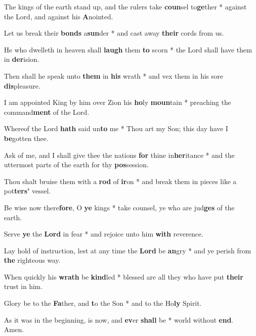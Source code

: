 \begin{multicols}{2}
	The kings of the earth stand up, and the rulers take \textbf{coun}sel to\textbf{ge}ther * against the Lord, and against his \textbf{A}nointed.
	
	Let us break their \textbf{bonds} a\textbf{sun}der * and cast away \textbf{their} cords from us.
	
	He who dwelleth in heaven shall \textbf{laugh} them \textbf{to} scorn * the Lord shall have them in \textbf{der}ision.
	
	Then shall he speak unto \textbf{them} in \textbf{his} wrath * and vex them in his sore \textbf{dis}pleasure.
	
	I am appointed King by him over Zion his \textbf{ho}ly \textbf{moun}tain * preaching the command\textbf{ment} of the Lord.
	
	Whereof the Lord \textbf{hath} said un\textbf{to} me * Thou art my Son; this day have I \textbf{be}gotten thee.
	
	Ask of me, and I shall give thee the nations \textbf{for} thine in\textbf{her}itance * and the uttermost parts of the earth for thy \textbf{pos}session.
	
	Thou shalt bruise them with a \textbf{rod} of \textbf{ir}on * and break them in pieces like a pot\textbf{ters'} vessel.
	
	Be wise now there\textbf{fore}, O \textbf{ye} kings * take counsel, ye who are jud\textbf{ges} of the earth.
	
	Serve \textbf{ye} the \textbf{Lord} in fear * and rejoice unto him \textbf{with} reverence.
	
	Lay hold of instruction, lest at any time the \textbf{Lord} be \textbf{an}gry * and ye perish from \textbf{the} righteous way.
	
	When quickly his \textbf{wrath} be \textbf{kind}led * blessed are all they who have put \textbf{their} trust in him.
	
	Glory be to the \textbf{Fa}ther, and \textbf{t}o the Son * and to the Ho\textbf{ly} Spirit.
	
	As it was in the beginning, is now, and \textbf{ev}er \textbf{shall} be * world without \textbf{end}. Amen.
\end{multicols}